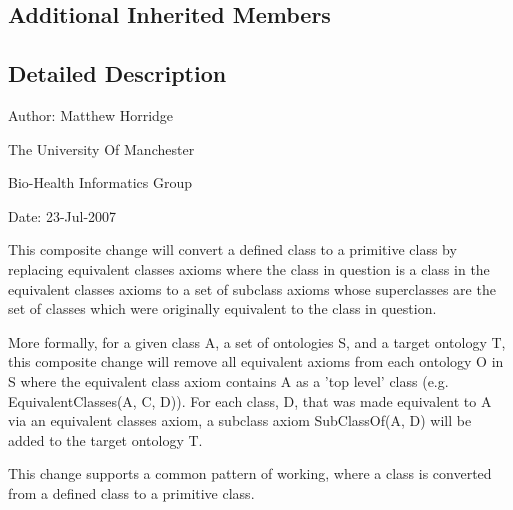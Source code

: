 \subsection*{Additional Inherited Members}


\subsection{Detailed Description}
Author\-: Matthew Horridge\par
 The University Of Manchester\par
 Bio-\/\-Health Informatics Group\par
 Date\-: 23-\/\-Jul-\/2007\par
\par
 

This composite change will convert a defined class to a primitive class by replacing equivalent classes axioms where the class in question is a class in the equivalent classes axioms to a set of subclass axioms whose superclasses are the set of classes which were originally equivalent to the class in question. 

More formally, for a given class A, a set of ontologies S, and a target ontology T, this composite change will remove all equivalent axioms from each ontology O in S where the equivalent class axiom contains A as a 'top level' class (e.\-g. Equivalent\-Classes(\-A, C, D)). For each class, D, that was made equivalent to A via an equivalent classes axiom, a subclass axiom Sub\-Class\-Of(\-A, D) will be added to the target ontology T. 

This change supports a common pattern of working, where a class is converted from a defined class to a primitive class. 

